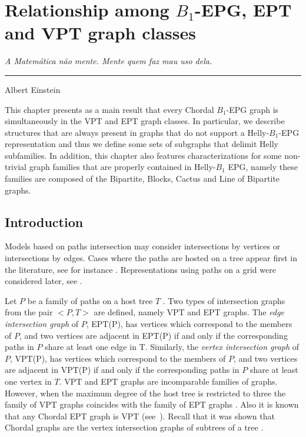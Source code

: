 \chapter{Relationship among  $B_1$-EPG, EPT and VPT graph classes}
\label{cap:v}

\begin{flushright}
\begin{minipage}[t][0cm][b]{0.47\textwidth}
\emph{
A Matemática não mente. Mente quem faz mau uso dela.}
\end{minipage}

\rule[0cm]{7cm}{0.03cm}%

Albert Einstein
\end{flushright}

This chapter presents as a main result that every Chordal $B_1$-EPG graph is simultaneously in the VPT and EPT graph classes. In particular, we describe structures that are always present in graphs that do not support a Helly-$B_1$-EPG representation and thus we define some sets of subgraphs that delimit Helly subfamilies. 
 In addition, this chapter also features characterizations for some non-trivial graph families that are properly contained in Helly-$B_1$ EPG, namely these families are composed of the Bipartite, Blocks, Cactus and Line of Bipartite  graphs.



\section{Introduction}

Models based on paths intersection  may consider  intersections by vertices or   intersections by edges.  Cases where the paths are hosted on a tree  appear first in the literature, see for instance \cite{gavril1978recognition, golumbic1985edge, golumbic1985}.  Representations using paths on a grid were considered later, see  \cite{golumbic2009,golumbic2013, golumbic2013intersection}. %

 Let $P$ be a family of paths on a host tree $T$ . Two types of intersection graphs from the pair $<P,T>$ are defined, namely VPT and EPT graphs.
The \textit{edge intersection graph} of $P$, EPT(P), has vertices which correspond to the members of $P$, and two vertices are adjacent in EPT(P) if and only if the corresponding paths in $P$ share at least one edge in T. Similarly, the \textit{vertex intersection graph} of $P$, VPT(P), has vertices which correspond to the members of $P$, and two vertices are adjacent in VPT(P) if and only if the corresponding paths in $P$ share at least one vertex in $T$.
%
VPT and EPT graphs are incomparable families of graphs. However, when the maximum degree of the host tree is restricted to three the family of
VPT graphs coincides with the family of EPT graphs \cite{golumbic1985edge%
}. Also it is known that any Chordal EPT graph is VPT (see~\cite{syslo1985triangulated}). Recall that it was shown that Chordal graphs are the vertex intersection graphs of subtrees of a tree \cite{gavril1974intersection}.


